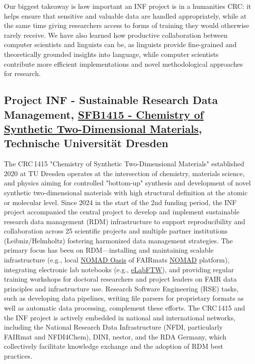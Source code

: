 \documentclass{eceasst}
\begin{document}
Our biggest takeaway is how important an INF project is in a humanities CRC: it helps ensure that sensitive and valuable data are handled appropriately, while at the same time giving researchers access to forms of training they would otherwise rarely receive. We have also learned how productive collaboration between computer scientists and linguists can be, as linguists provide fine-grained and theoretically grounded insights into language, while computer scientists contribute more efficient implementations and novel methodological approaches for research.


\subsection{Project INF - Sustainable Research Data Management, \href{https://gepris.dfg.de/gepris/projekt/417590517?language=en}{SFB1415 -  Chemistry of Synthetic Two-Dimensional Materials}, Technische Universität Dresden}
The CRC\,1415 "Chemistry of Synthetic Two-Dimensional Materials" established 2020 at TU Dresden operates at the intersection of chemistry, materials science, and physics
 aiming for controlled "bottom-up" synthesis and development of novel synthetic two-dimensional materials with high structural definition at the atomic or molecular level.
Since 2024 in the start of the 2nd funding period, the INF project accompanied the central project to develop and implement sustainable research data management (RDM)
infrastructure to support reproducibility and collaboration across 25 scientific projects and multiple partner institutions (Leibniz/Helmholtz) fostering harmonized data management strategies.
The primary focus has been on RDM—installing and maintaining scalable infrastructure
(e.g., local \href{https://nomad-lab.eu/nomad-lab/nomad-oasis.html}{NOMAD Oasis} of FAIRmats \href{https://nomad-lab.eu/nomad-lab/nomad.html}{NOMAD} platform),
integrating electronic lab notebooks (e.g., \href{https://www.elabftw.net/}{eLabFTW}),
and providing regular training workshops for doctoral researchers and project leaders on FAIR data principles and infrastructure use.
Research Software Engineering (RSE) tasks, such as developing data pipelines, writing file parsers for proprietary formats as well as automatic data processing, complement these efforts.
The CRC\,1415 and the INF project is actively embedded in national and international networks,
including the National Research Data Infrastructure (NFDI, particularly FAIRmat and NFDI4Chem), DINI, nestor, and the RDA Germany,
which collectively facilitate knowledge exchange and the adoption of RDM best practices.
\end{document}
